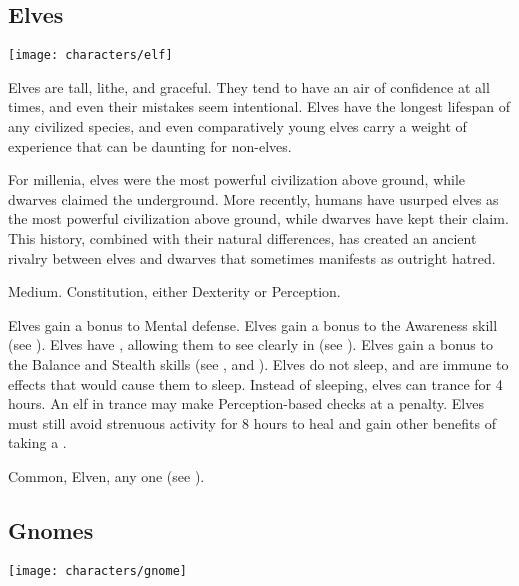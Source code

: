     \subsection{Elves}
        \texttt{[image: characters/elf]}

        Elves are tall, lithe, and graceful.
        They tend to have an air of confidence at all times, and even their mistakes seem intentional.
        Elves have the longest lifespan of any civilized species, and even comparatively young elves carry a weight of experience that can be daunting for non-elves.

        For millenia, elves were the most powerful civilization above ground, while dwarves claimed the underground.
        More recently, humans have usurped elves as the most powerful civilization above ground, while dwarves have kept their claim.
        This history, combined with their natural differences, has created an ancient rivalry between elves and dwarves that sometimes manifests as outright hatred.

         Medium.
          Constitution, either  Dexterity or  Perception.
        \begin{raggeditemize}
             Elves gain a  bonus to Mental defense.
             Elves gain a  bonus to the Awareness skill (see ).
             Elves have , allowing them to see clearly in  (see ).
             Elves gain a  bonus to the Balance and Stealth skills (see , and ).
             Elves do not sleep, and are immune to \magical effects that would cause them to sleep.
                Instead of sleeping, elves can trance for 4 hours.
                An elf in trance may make Perception-based checks at a  penalty.
                Elves must still avoid strenuous activity for 8 hours to heal and gain other benefits of taking a .
        \end{raggeditemize}
         Common, Elven, any one  (see ).

    \subsection{Gnomes}
        \texttt{[image: characters/gnome]}

